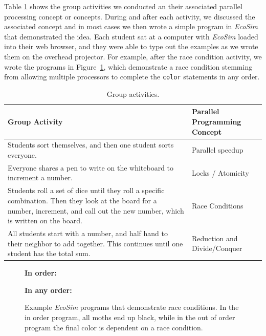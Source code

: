 \documentclass{sig-alternate}
\newcommand{\INDSTATE}[1][1]{\STATE\hspace{#1\algorithmicindent}}
\begin{document}
Table \ref{tab:group-activities} shows the group activities we conducted an their associated
parallel processing concept or concepts.  During and after each activity, we discussed the
associated concept and in most cases we then wrote a simple program in \emph{EcoSim} that
demonstrated the idea.  Each student sat at a computer with \emph{EcoSim} loaded into their
web browser, and they were able to type out the examples as we wrote them on the overhead 
projector.
For example, after the race condition activity, we wrote the programs in 
Figure~\ref{fig:race-conditions}, which demonstrate a race condition stemming from allowing multiple
processors to complete the \texttt{color} statements in any order.

\begin{table}
\centering \begin{tabular}{p{11cm} | p{5cm}} 
\toprule
Group Activity               &  Parallel Programming Concept \\ \midrule
Students sort themselves, and then one student sorts everyone.     & Parallel speedup \\ \hline
Everyone shares a pen to write on the whiteboard to increment a number. & Locks / Atomicity  \\ \hline
Students roll a set of dice until they roll a specific combination.  Then they
look at the board for a number, increment, and call out the new number, which is
written on the board.  & Race Conditions \\ \hline
All students start with a number, and half hand to their neighbor to add together.
This continues until one student has the total sum. & Reduction and Divide/Conquer  \\
\bottomrule 
\end{tabular}
\caption{Group activities.}
\label{tab:group-activities}
\end{table} 
     
\begin{figure}
\begin{algorithmic}[1]
\item[{\bf In order:}]
  \INDSTATE{a position}
  \INDSTATE{a color}
\STATE{}
  \INDSTATE{do in order}
  \INDSTATE[2]{replace the moth's color with gray}
  \INDSTATE[2]{replace the moth's color with black}
\end{algorithmic}

\begin{algorithmic}[1]
\item[{\bf In any order:}]
  \INDSTATE{a position}
  \INDSTATE{a color}
\STATE{}
  \INDSTATE{do in any order}
  \INDSTATE[2]{replace the moth's color with gray}
  \INDSTATE[2]{replace the moth's color with black}
\end{algorithmic} 
\caption{Example \emph{EcoSim} programs that demonstrate race conditions.  In the
in order program, all moths end up black, while in the out of order program
the final color is dependent on a race condition.}
\label{fig:race-conditions} 
\end{figure}
\end{document}
